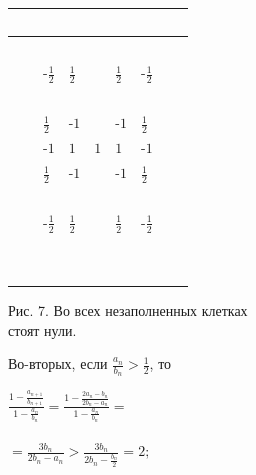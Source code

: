 \documentclass{article}
\begin{document}
\begin{multicols}{2}
\renewcommand{\arraystretch}{1.5}
\parindent0pt\begin{tabular}[b]{ | m{0.4cm} | m{0.4cm} | m{0.4cm} | m{0.4cm} | m{0.4cm} | m{0.4cm} | m{0.4cm} | m{0.4cm} | m{0.4cm} | }
\hline
$ $ & $ $ & $ $ & $ $ & $ $ & $ $ & $ $ & $ $ & $ $ \\ \hline
$ $ & $ $ & $ $ & $ $ & $ $ & $ $ & $ $ & $ $ & $ $\\ \hline
$ $ & $ $ & $\text{-}\frac{1}{2}$ & $\frac{1}{2}$ & $ $ & $\frac{1}{2}$ & $\text{-}\frac{1}{2}$ & $ $ & $ $ \\ \hline
$ $ & $ $ & $ $ & $ $ & $ $ & $ $ & $ $ & $ $ & $ $\\ \hline
$ $ & $ $ & $\frac{1}{2}$ & $\text{-}1$ & $ $ & $\text{-}1$ & $\frac{1}{2}$ & $ $ & $ $\\ \hline
$ $ & $ $ & $\text{-}1$ & $1$ & $1$ & $1$ & $\text{-}1$ & $ $ & $ $\\ \hline
$ $ & $ $ & $\frac{1}{2}$ & $\text{-}1$ & $ $ & $\text{-}1$ & $\frac{1}{2}$ & $ $ & $ $\\ \hline
$ $ & $ $ & $ $ & $ $ & $ $ & $ $ & $ $ & $ $ & $ $\\ \hline
$ $ & $ $ & $\text{-}\frac{1}{2}$ & $\frac{1}{2}$ & $ $ & $\frac{1}{2}$ & $\text{-}\frac{1}{2}$ & $ $ & $ $ \\ \hline
$ $ & $ $ & $ $ & $ $ & $ $ & $ $ & $ $ & $ $ & $ $\\ \hline
$ $ & $ $ & $ $ & $ $ & $ $ & $ $ & $ $ & $ $ & $ $\\ 
\hline
\end{tabular}
\renewcommand{\arraystretch}{1}

Рис. 7. Во всех незаполненных клетках \\
стоят нули.
\par

\setlength{\parindent}{15pt} Во-вторых, если $\frac{a_n}{b_n}>\frac{1}{2}$, то \\
\begin{large}
\setlength{\parindent}{10pt}
\indent $\frac{1-\frac{a_{n+1}}{b_{n+1}}}{1-\frac{a_n}{b_n}}=\frac{1-\frac{2a_n-b_n}{2b_n-a_n}}{1-\frac{a_n}{b_n}}=$\\
\\
\setlength{\parindent}{90pt} 
\indent $=\frac{3b_n}{2b_n-a_n}>\frac{3b_n}{2b_n-\frac{b_n}{2}}=2;$
\end{large}



\end{multicols}
\end{document}
